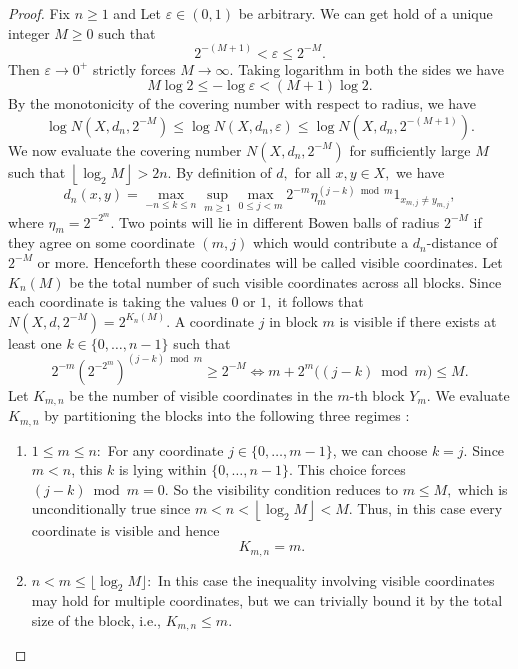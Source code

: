 \documentclass[a4paper,11pt,reqno]{amsart}
\theoremstyle{plain}
\theoremstyle{mainthmstyle}
\theoremstyle{named}
\numberwithin{equation}{section}
\begin{document}
\begin{proof}
Fix $n \ge 1$ and Let $\varepsilon \in (0, 1)$ be arbitrary. We can get hold of a unique integer $M \ge 0$ such that
$$2^{-(M+1)} < \varepsilon \le 2^{-M}.$$
Then $\varepsilon \to 0^{+}$ strictly forces $M \to \infty.$ Taking logarithm in both the sides we have
$$M \log 2 \le -\log \varepsilon < (M + 1) \log 2.$$
By the monotonicity of the covering number with respect to radius, we have
$$\log N(X, d_n, 2^{-M}) \le \log N(X, d_n, \varepsilon) \le \log N(X, d_n, 2^{-(M+1)}).$$
We now evaluate the covering number $N(X, d_n, 2^{-M})$ for sufficiently large $M$ such that $\left \lfloor \log_2 M \right \rfloor > 2 n.$
By definition of $d,$ for all $x, y \in X,$ we have
$$d_n(x, y) = \max_{- n \leq k \leq n} \sup_{m \ge 1} \max_{0 \le j < m} 2^{-m} \eta_m^{(j - k) \bmod m} 1_{x_{m, j} \neq y_{m, j}},$$
where $\eta_m = 2^{-2^m}$. Two points will lie in different Bowen balls of radius $2^{-M}$ if they agree on some coordinate $(m, j)$ which would contribute a $d_n$-distance of $2^{-M}$ or more. Henceforth these coordinates will be called visible coordinates.
Let $K_n(M)$ be the total number of such visible coordinates across all blocks. Since each coordinate is taking the values $0$ or $1,$ it follows that $N(X, d, 2^{-M}) = 2^{K_n(M)}.$ A coordinate $j$ in block $m$ is visible if there exists at least one $k \in \{0, \dots, n-1\}$ such that
$$2^{-m} \left(2^{-2^m}\right)^{(j - k) \bmod m} \ge 2^{-M} \iff m + 2^m \big((j - k) \bmod m\big) \le M.$$
Let $K_{m,n}$ be the number of visible coordinates in the $m$-th block $Y_m.$ We evaluate $K_{m,n}$ by partitioning the blocks into the following three regimes $:$

\begin{enumerate}
\item $1 \leq m \leq n:$ For any coordinate $j \in \{0, \dots, m-1\}$, we can choose $k = j.$ Since $m < n$, this $k$ is lying within $\{0, \dots, n-1\}.$ This choice forces $(j - k) \bmod m = 0.$ So the visibility condition reduces to $m \leq M,$ which is unconditionally true since $m < n < \left \lfloor \log_2 M \right \rfloor < M$. Thus, in this case every coordinate is visible and hence $$K_{m,n} = m.$$

\item $n < m \le \lfloor \log_2 M \rfloor:$ In this case the inequality involving visible coordinates may hold for multiple coordinates, but we can trivially bound it by the total size of the block, i.e., $K_{m,n} \le m$.


\end{enumerate}
\end{proof}
\end{document}
